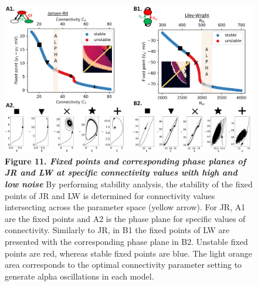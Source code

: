\documentclass[12pt,twoside]{article}
\begin{document}
\begin{figure}[H]
    \centering
    \includegraphics[scale=0.4]{Images/Stability_noise_short.png}
    \caption*{\textbf{Figure 11.  \textit{Fixed points and corresponding phase planes of JR and LW at specific connectivity values with high and low noise}} By performing stability analysis, the stability of the fixed points of JR and LW is determined for connectivity values intersecting across the parameter space (yellow arrow). For JR, A1 are the fixed points and A2 is the phase plane for specific values of connectivity. Similarly to JR, in B1 the fixed points of LW are presented with the corresponding phase plane in B2. Unstable fixed points are red, whereas stable fixed points are blue. The light orange area corresponds to the optimal connectivity parameter setting to generate alpha oscillations in each model.} \label{fig:Fixed_points}
\end{figure}
\vspace{-1.15cm}
\end{document}
